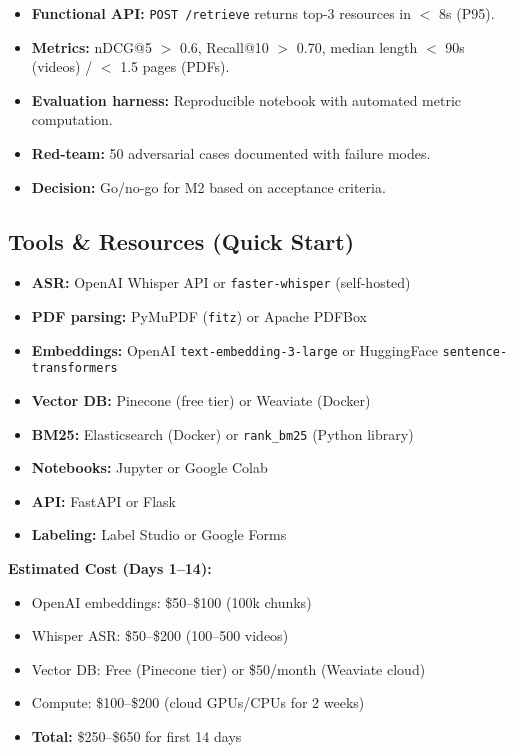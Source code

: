\documentclass[11pt,letterpaper]{article}
\begin{document}
\begin{itemize}
\item \textbf{Functional API:} \texttt{POST /retrieve} returns top-3 resources in $<$ 8s (P95).
\item \textbf{Metrics:} nDCG@5 $>$ 0.6, Recall@10 $>$ 0.70, median length $<$ 90s (videos) / $<$ 1.5 pages (PDFs).
\item \textbf{Evaluation harness:} Reproducible notebook with automated metric computation.
\item \textbf{Red-team:} 50 adversarial cases documented with failure modes.
\item \textbf{Decision:} Go/no-go for M2 based on acceptance criteria.
\end{itemize}

\subsection{Tools \& Resources (Quick Start)}

\begin{itemize}
\item \textbf{ASR:} OpenAI Whisper API or \texttt{faster-whisper} (self-hosted)
\item \textbf{PDF parsing:} PyMuPDF (\texttt{fitz}) or Apache PDFBox
\item \textbf{Embeddings:} OpenAI \texttt{text-embedding-3-large} or HuggingFace \texttt{sentence-transformers}
\item \textbf{Vector DB:} Pinecone (free tier) or Weaviate (Docker)
\item \textbf{BM25:} Elasticsearch (Docker) or \texttt{rank\_bm25} (Python library)
\item \textbf{Notebooks:} Jupyter or Google Colab
\item \textbf{API:} FastAPI or Flask
\item \textbf{Labeling:} Label Studio or Google Forms
\end{itemize}

\textbf{Estimated Cost (Days 1--14):}
\begin{itemize}
\item OpenAI embeddings: \$50--\$100 (100k chunks)
\item Whisper ASR: \$50--\$200 (100--500 videos)
\item Vector DB: Free (Pinecone tier) or \$50/month (Weaviate cloud)
\item Compute: \$100--\$200 (cloud GPUs/CPUs for 2 weeks)
\item \textbf{Total:} \$250--\$650 for first 14 days
\end{itemize}
\end{document}

